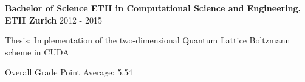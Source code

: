 \textbf{Bachelor of Science ETH in Computational Science and Engineering, ETH Zurich} \hfill 2012 - 2015

Thesis: Implementation of the two-dimensional Quantum Lattice Boltzmann scheme in CUDA

Overall Grade Point Average: 5.54
